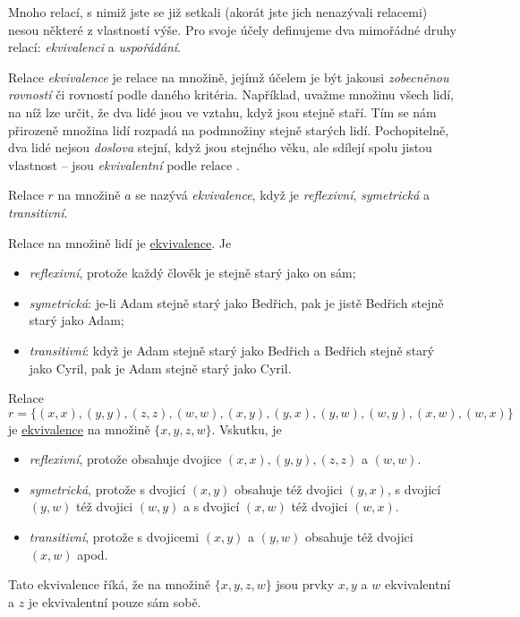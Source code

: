Mnoho relací, s nimiž jste se již setkali (akorát jste jich nenazývali relacemi)
nesou některé z vlastností výše. Pro svoje účely definujeme dva mimořádné druhy
relací: \emph{ekvivalenci} a \emph{uspořádání}.

Relace \emph{ekvivalence} je relace na množině, jejímž účelem je být jakousi
\emph{zobecněnou rovností} či rovností podle daného kritéria. Například, uvažme
množinu všech lidí, na níž lze určit, že dva lidé jsou ve vztahu, když jsou
stejně staří. Tím se nám přirozeně množina lidí rozpadá na podmnožiny stejně
starých lidí. Pochopitelně, dva lidé nejsou \emph{doslova} stejní, když jsou
stejného věku, ale sdílejí spolu jistou vlastnost -- jsou \emph{ekvivalentní}
podle relace .

\begin{definition}
  \label{def:relace-ekvivalence}
  Relace $r$ na množině $a$ se nazývá \emph{ekvivalence}, když je
  \emph{reflexivní}, \emph{symetrická} a \emph{transitivní}.
\end{definition}
\begin{example}
  \label{exam:relace-ekvivalence}
  Relace  na množině lidí je
  \hyperref[def:relace-ekvivalence]{ekvivalence}. Je
  \begin{itemize}
    \item \emph{reflexivní}, protože každý člověk je stejně starý jako on sám;
    \item \emph{symetrická}: je-li Adam stejně starý jako Bedřich, pak
      je jistě Bedřich stejně starý jako Adam;
    \item \emph{transitivní}: když je Adam stejně starý jako Bedřich a Bedřich
      stejně starý jako Cyril, pak je Adam stejně starý jako Cyril.
  \end{itemize}
\end{example}
\begin{example}
  \label{exam:ekvivalence-2}
  Relace
  \[
    r = \{(x, x), (y, y), (z, z), (w, w), (x, y), (y, x), (y, w), (w, y), (x,
    w), (w, x)\}
  \]
  je \hyperref[def:relace-ekvivalence]{ekvivalence} na množině $\{x, y, z, w\}$.
  Vskutku, je
  \begin{itemize}
    \item \emph{reflexivní}, protože obsahuje dvojice $(x, x), (y, y), (z,
      z)$ a $(w, w)$.
    \item \emph{symetrická}, protože s dvojicí $(x, y)$ obsahuje též dvojici
      $(y, x)$, s dvojicí $(y, w)$ též dvojici $(w, y)$ a s dvojicí $(x, w)$ též
      dvojici $(w, x)$.
    \item \emph{transitivní}, protože s dvojicemi $(x, y)$ a $(y, w)$ obsahuje
      též dvojici $(x, w)$ apod.
  \end{itemize}
  Tato ekvivalence říká, že na množině $\{x, y, z, w\}$ jsou prvky $x, y$ a $w$
  ekvivalentní a $z$ je ekvivalentní pouze sám sobě.
\end{example}
